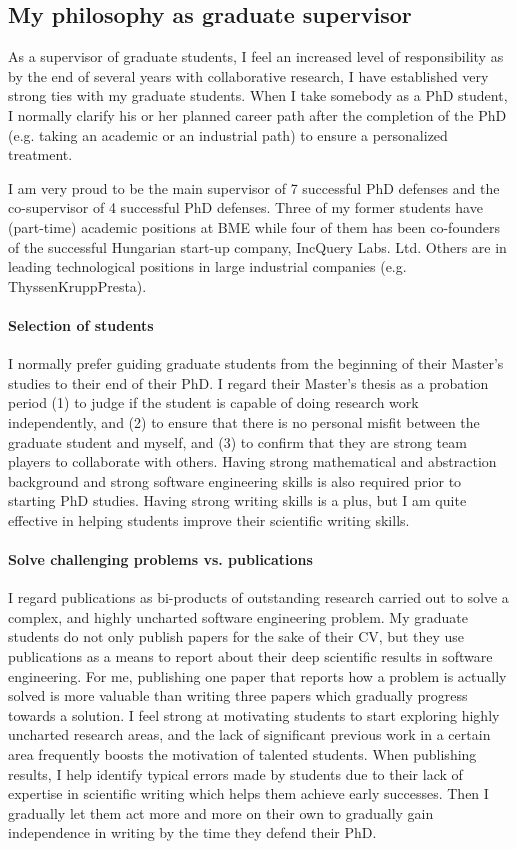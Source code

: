 \subsection{My philosophy as graduate supervisor}

As a supervisor of graduate students, I feel an increased level of responsibility as by the end of several years with collaborative research, I have established very strong ties with my graduate students. When I take somebody as a PhD student, I normally clarify his or her planned career path after the completion of the PhD (e.g. taking an academic or an industrial path) to ensure a personalized treatment. 

I am very proud to be the main supervisor of 7 successful PhD defenses and the co-supervisor of 4 successful PhD defenses. Three of my former students have (part-time) academic positions at BME while four of them has been co-founders of the successful Hungarian start-up company, IncQuery Labs. Ltd. Others are in leading technological positions in large industrial companies (e.g. ThyssenKruppPresta).

\paragraph{Selection of students}
I normally prefer guiding graduate students from the beginning of their Master's studies to their end of their PhD. I regard their Master's thesis as a probation period (1) to judge if the student is capable of doing research work independently, and (2) to ensure that there is no personal misfit between the graduate student and myself, and (3) to confirm that they are strong team players to collaborate with others. Having strong mathematical and abstraction background and strong software engineering skills is also required prior to starting PhD studies. Having strong writing skills is a plus, but I am quite effective in helping students improve their scientific writing skills. 

\paragraph{Solve challenging problems vs. publications}
I regard publications as bi-products of outstanding research carried out to solve a complex, and highly uncharted software engineering problem. My graduate students do not only publish papers for the sake of their CV, but they use publications as a means to report about their deep scientific results in software engineering. For me, publishing one paper that reports how a problem is actually solved is more valuable than writing three papers which gradually progress towards a solution. I feel strong at motivating students to start exploring highly uncharted research areas, and the lack of significant previous work in a certain area frequently boosts the motivation of talented students. 
When publishing results, I help identify typical errors made by students due to their lack of expertise in scientific writing which helps them achieve early successes. Then I gradually let them act more and more on their own to gradually gain independence in writing by the time they defend their PhD. 

